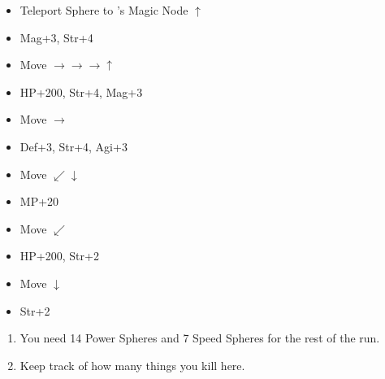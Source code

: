 \begin{spheregrid}
\begin{itemize}
		\begin{itemize}
			\item Teleport Sphere to \auron's Magic Node $\uparrow$
			\item Mag+3, Str+4
			\item Move $\rightarrow\rightarrow\rightarrow\uparrow$
			\item HP+200, Str+4, Mag+3
			\item Move $\rightarrow$
			\item Def+3, Str+4, Agi+3
			\item Move $\swarrow\downarrow$
			\item MP+20
			\item Move $\swarrow$
			\item HP+200, Str+2
			\item Move $\downarrow$
			\item Str+2
		\end{itemize}
	\end{itemize}
\end{spheregrid}
\begin{enumerate}[resume]
	\item You need 14 Power Spheres and 7 Speed Spheres for the rest of the run.
	\item Keep track of how many things you kill here.
\end{enumerate}
